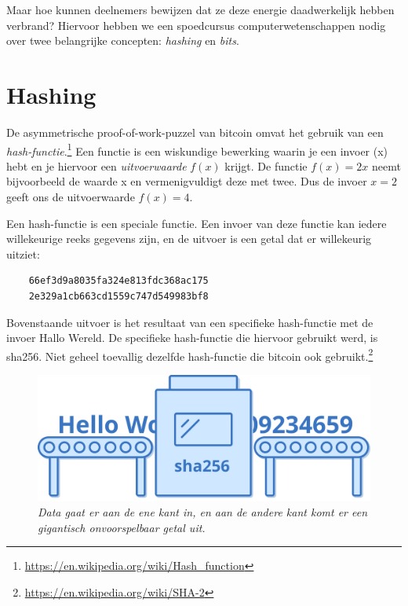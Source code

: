 \documentclass[smalldemyvopaper,11pt,twoside,onecolumn,openright,extrafontsizes]{memoir}
\begin{document}
Maar hoe kunnen deelnemers bewijzen dat ze deze energie daadwerkelijk hebben verbrand? Hiervoor hebben we een spoedcursus computerwetenschappen nodig over twee belangrijke concepten: \textit{hashing} en \textit{bits}.

\section{Hashing}

De asymmetrische proof-of-work-puzzel van bitcoin omvat het gebruik van een \textit{hash-functie}.\footnote{\href{https://en.wikipedia.org/wiki/Hash\_function}{https://en.wikipedia.org/wiki/Hash\_function}} Een functie is een wiskundige bewerking waarin je een invoer (x) hebt en je hiervoor een \textit{uitvoerwaarde} $f(x)$ krijgt. De functie $f(x)=2x$ neemt bijvoorbeeld de waarde x en vermenigvuldigt deze met twee. Dus de invoer $x=2$ geeft ons de uitvoerwaarde $f(x)=4$.

Een hash-functie is een speciale functie. Een invoer van deze functie kan iedere willekeurige reeks gegevens zijn, en de uitvoer is een getal dat er willekeurig uitziet:

\begin{verbatim}
    66ef3d9a8035fa324e813fdc368ac175
    2e329a1cb663cd1559c747d549983bf8
\end{verbatim}

Bovenstaande uitvoer is het resultaat van een specifieke hash-functie met de invoer \textquotedbl{}Hallo Wereld\textquotedbl{}. De specifieke hash-functie die hiervoor gebruikt werd, is sha256. Niet geheel toevallig dezelfde hash-functie die bitcoin ook gebruikt.\footnote{\href{https://en.wikipedia.org/wiki/SHA-2}{https://en.wikipedia.org/wiki/SHA-2}}

\begin{figure}
    \centering
    \includegraphics[width=\textwidth]{images/fig4.png}
    \caption{\footnotesize{\textit{Data gaat er aan de ene kant in, en aan de andere kant komt er een gigantisch onvoorspelbaar getal uit.}}}
    \label{fig4}
\end{figure}
\end{document}
